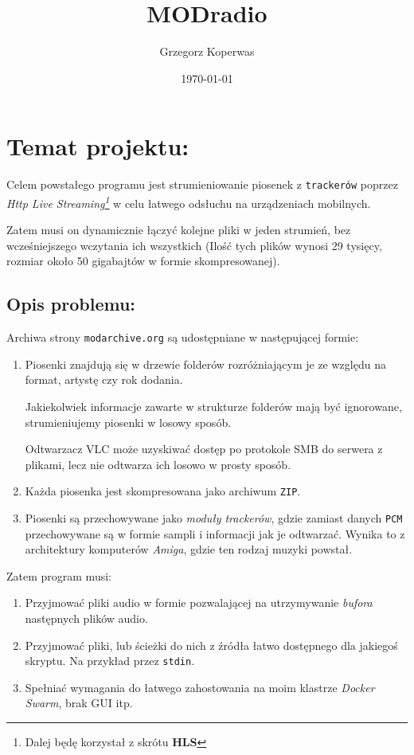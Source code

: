 \documentclass[a4paper,12pt]{article}
\title{MODradio}
\author{Grzegorz Koperwas}
\date{\today}
\begin{document}
\maketitle

\section{Temat projektu:}

Celem powstałego programu jest strumieniowanie piosenek z \texttt{trackerów}
poprzez \emph{Http Live Streaming\footnote{Dalej będę korzystał z skrótu
\textbf{HLS}}} w celu łatwego odsłuchu na urządzeniach
mobilnych.

Zatem musi on dynamicznie łączyć kolejne pliki w jeden strumień, bez
wcześniejszego wczytania ich wszystkich (Ilość tych plików wynosi 29 tysięcy,
rozmiar około 50 gigabajtów w formie skompresowanej).

\subsection*{Opis problemu:}

Archiwa strony \texttt{modarchive.org} są udostępniane w następującej formie:

\begin{enumerate}
        \item Piosenki znajdują się w drzewie folderów rozróżniającym je ze
            względu na format, artystę czy rok dodania. 

            Jakiekolwiek informacje zawarte w strukturze folderów mają być
            ignorowane, strumieniujemy piosenki w losowy sposób.

            Odtwarzacz VLC
            może uzyskiwać dostęp po protokole SMB do serwera z plikami, lecz
            nie odtwarza ich losowo w prosty sposób.

        \item Każda piosenka jest skompresowana jako archiwum \texttt{ZIP}.

        \item Piosenki są przechowywane jako \emph{moduły trackerów}, gdzie
            zamiast danych \texttt{PCM} przechowywane są w formie sampli i
            informacji jak je odtwarzać. Wynika to z architektury komputerów
            \emph{Amiga}, gdzie ten rodzaj muzyki powstał.
\end{enumerate}

Zatem program musi:

\begin{enumerate}
        \item Przyjmować pliki audio w formie pozwalającej na utrzymywanie
            \emph{bufora} następnych plików audio.
        \item Przyjmować pliki, lub ścieżki do nich z źródła łatwo dostępnego 
            dla jakiegoś skryptu. Na przykład przez \texttt{stdin}.
        \item Spełniać wymagania do łatwego zahostowania na moim klastrze
            \emph{Docker Swarm}, brak GUI itp.
\end{enumerate}
\end{document}
